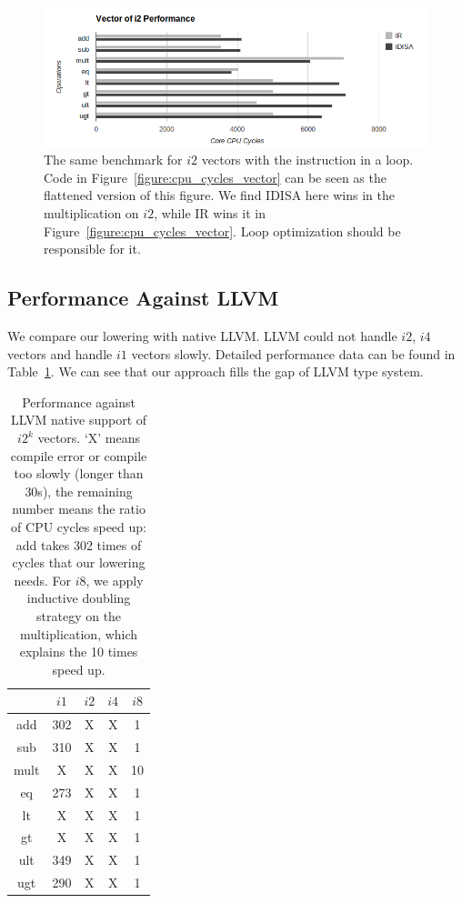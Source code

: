 \begin{figure}[htbp!]
\centering
\includegraphics[width=140mm]{draw/loop_vector_i2.png}
\caption[Vector of $i2$ tested in a loop]{The same benchmark for $i2$ vectors with the instruction in a loop. Code in Figure~\ref{figure:cpu_cycles_vector} can be seen as the flattened version of this figure. We find IDISA here wins in the multiplication on $i2$, while IR wins it in Figure~\ref{figure:cpu_cycles_vector}. Loop optimization should be responsible for it.}
\label{figure:loop_vector_i2}
\end{figure}

\subsection{Performance Against LLVM}
We compare our lowering with native LLVM\@. LLVM could not handle $i2$, $i4$ vectors and handle $i1$ vectors slowly. Detailed performance data can be found in Table~\ref{table:vector_perf_LLVM}. We can see that our approach fills the gap of LLVM type system.

\begin{table}[h]
\centering
\begin{tabular}{|c|c|c|c|c|}
\hline
     & $i1$ & $i2$ & $i4$ & $i8$ \\ \hline
add  & 302  & X    & X    & 1\\ \hline
sub  & 310  & X    & X    & 1\\ \hline
mult & X    & X    & X    & 10\\ \hline
eq   & 273  & X    & X    & 1\\ \hline
lt   & X    & X    & X    & 1\\ \hline
gt   & X    & X    & X    & 1\\ \hline
ult  & 349  & X    & X    & 1\\ \hline
ugt  & 290  & X    & X    & 1\\ \hline
\end{tabular}
\caption[Performance against LLVM native support for $i2^k$ vectors]{Performance against LLVM native support of $i2^k$ vectors. `X' means compile error or compile too slowly (longer than 30s), the remaining number means the ratio of CPU cycles speed up: add takes 302 times of cycles that our lowering needs. For $i8$, we apply inductive doubling strategy on the multiplication, which explains the 10 times speed up. }
\label{table:vector_perf_LLVM}
\end{table}

